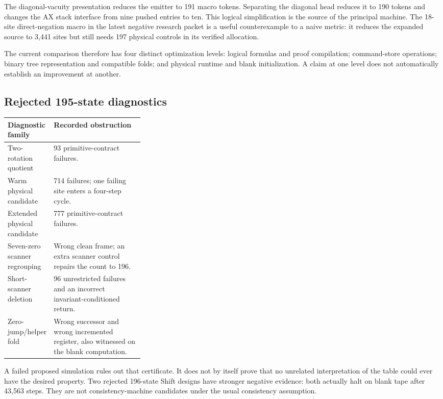 The diagonal-vacuity presentation reduces the emitter to 191 macro tokens.
Separating the diagonal head reduces it to 190 tokens and changes the AX
stack interface from nine pushed entries to ten. This logical simplification
is the source of the principal machine. The 18-site direct-negation macro
in the latest negative research packet is a useful counterexample to a
naive metric: it reduces the expanded source to 3,441 sites but still needs
197 physical controls in its verified allocation.

The current comparison therefore has four distinct optimization levels:
logical formulas and proof compilation; command-store operations; binary
tree representation and compatible folds; and physical runtime and blank
initialization. A claim at one level does not automatically establish an
improvement at another.

\subsection{Rejected 195-state diagnostics}

\begin{center}\small
\begin{tabularx}{\linewidth}{@{}p{0.31\linewidth}X@{}}
\toprule
Diagnostic family & Recorded obstruction\\
\midrule
Two-rotation quotient & 93 primitive-contract failures.\\
Warm physical candidate & 714 failures; one failing site enters a four-step cycle.\\
Extended physical candidate & 777 primitive-contract failures.\\
Seven-zero scanner regrouping & Wrong clean frame; an extra scanner control repairs the count to 196.\\
Short-scanner deletion & 96 unrestricted failures and an incorrect invariant-conditioned return.\\
Zero-jump/helper fold & Wrong successor and wrong incremented register, also witnessed on the blank computation.\\
\bottomrule
\end{tabularx}
\end{center}
A failed proposed simulation rules out that certificate. It does not by
itself prove that no unrelated interpretation of the table could ever have
the desired property. Two rejected 196-state Shift designs have stronger
negative evidence: both actually halt on blank tape after 43,563 steps.
They are not consistency-machine candidates under the usual consistency
assumption.

